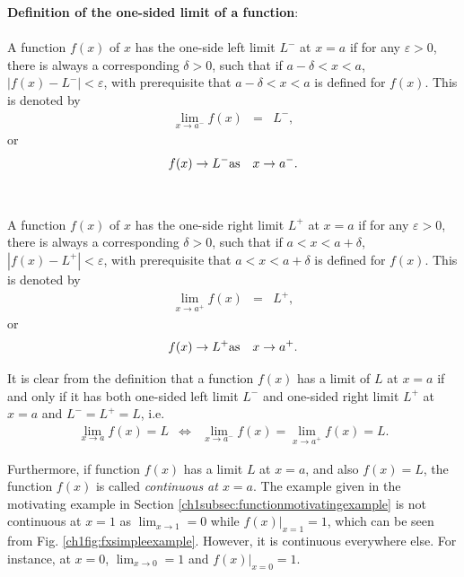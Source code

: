 \begin{VF}
\textbf{Definition of the one-sided limit of a function}:
\\
\\
\noindent A function $f(x)$ of $x$ has the one-side left limit $L^-$ at $x=a$ if for any $\varepsilon > 0$, there is always a corresponding $\delta > 0$, such that if $a-\delta<x<a$, $|f(x)-L^-| < \varepsilon$, with prerequisite that $a-\delta<x<a$ is defined for $f(x)$. This is denoted by
\begin{eqnarray}
   \lim_{x\rightarrow a^-} f(x) &=& L^-, \nonumber
\end{eqnarray}
or
\begin{eqnarray}
  f(x) \rightarrow L^- & \textup{as} & x \rightarrow a^-. \nonumber
\end{eqnarray}
\\
\\
\noindent A function $f(x)$ of $x$ has the one-side right limit $L^+$ at $x=a$ if for any $\varepsilon > 0$, there is always a corresponding $\delta > 0$, such that if $a<x<a+\delta$, $|f(x)-L^+| < \varepsilon$, with prerequisite that $a<x<a+\delta$ is defined for $f(x)$. This is denoted by
\begin{eqnarray}
   \lim_{x\rightarrow a^+} f(x) &=& L^+, \nonumber
\end{eqnarray}
or
\begin{eqnarray}
  f(x) \rightarrow L^+ & \textup{as} & x \rightarrow a^+. \nonumber
\end{eqnarray}
\end{VF}

It is clear from the definition that a function $f(x)$ has a limit of $L$ at $x=a$ if and only if it has both one-sided left limit $L^-$ and one-sided right limit $L^+$ at $x=a$ and $L^-=L^+=L$, i.e.
\begin{eqnarray}
  \lim_{x\rightarrow a}f(x)=L &\Leftrightarrow& \lim_{x\rightarrow a^-}f(x) = \lim_{x\rightarrow a^+}f(x) = L. \nonumber
\end{eqnarray}

Furthermore, if function $f(x)$ has a limit $L$ at $x=a$, and also $f(x)=L$, the function $f(x)$ is called \textit{continuous at $x=a$}. The example given in the motivating example in Section \ref{ch1subsec:functionmotivatingexample} is not continuous at $x=1$ as $\lim_{x\rightarrow 1}=0$ while $\left.f(x)\right|_{x=1}=1$, which can be seen from Fig. \ref{ch1fig:fxsimpleexample}. However, it is continuous everywhere else. For instance, at $x=0$, $\lim_{x\rightarrow 0}=1$ and $\left.f(x)\right|_{x=0}=1$.

